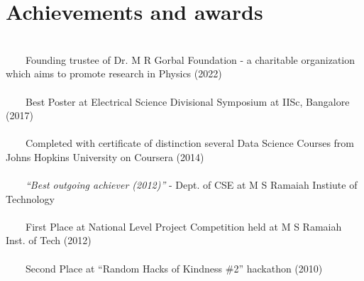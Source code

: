 \documentclass[a4paper,10pt]{article} %
\newcommand{\tabitem}{~~\llap{\textbullet}~~}
\begin{document}
\section{Achievements and awards}
~\\
\tabitem Founding trustee of Dr. M R Gorbal Foundation - a charitable organization which aims to promote research in Physics (2022) \\
~\\
\tabitem Best Poster at Electrical Science Divisional Symposium at IISc, Bangalore (2017)\\
\\
\tabitem Completed with certificate of distinction several Data Science Courses from Johns Hopkins University on Coursera (2014)\\
\\
\tabitem \textit{``Best outgoing achiever (2012)”} - Dept. of CSE at M S Ramaiah Instiute of Technology \\
\\
\tabitem First Place at National Level Project Competition held at M S Ramaiah Inst. of Tech (2012)\\
\\
\tabitem Second Place at “Random Hacks of Kindness \#2” hackathon (2010)\\

\end{document}
